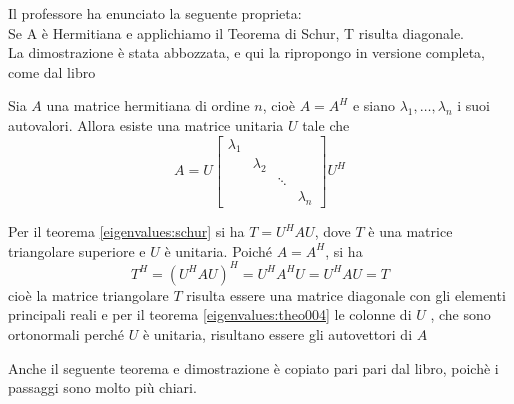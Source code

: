 \begin{notes}
 Il professore ha enunciato la seguente proprieta:\\
Se A \`e Hermitiana e applichiamo il Teorema di Schur, T risulta
diagonale. \\
La dimostrazione \`e stata abbozzata, e qui la ripropongo
in versione completa, come dal libro
\end{notes}
% 
%    
% 
% 

\begin{theo} \label{eigenvalues:theo005}
 Sia $A$ una matrice hermitiana di ordine $n$, cio\`e
$A = A^{H}$ e siano $\lambda_1, \ldots, \lambda_n$ i suoi
autovalori. Allora esiste una matrice unitaria $U$
tale che
$$ A = U
\left[
\begin{array}{cccc}
\lambda_1 & & &  \\
& \lambda_2 & &  \\
 & & \ddots &  \\
 & &  & \lambda_n 
\end{array}
\right]
U^{H}
$$
\end{theo}


\begin{thproof}
Per il teorema \ref{eigenvalues:schur} si ha $T = U^{H}AU$, dove $T$ \`e 
una matrice triangolare superiore e $U$ \`e unitaria. Poich\'e $A =A^{H}$, si ha
$$ T^{H} = (U^{H}AU)^{H} = U^{H}A^{H}U = U^{H}AU = T$$
cio\`e la matrice triangolare $T$ risulta essere una matrice
diagonale con gli elementi principali reali e per il teorema
\ref{eigenvalues:theo004} le colonne di $U$ , che sono ortonormali perch\'e $U$
\`e unitaria, risultano essere gli autovettori di $A$
\end{thproof}

\begin{notes}
 Anche il seguente teorema e dimostrazione \`e copiato pari pari
dal libro, poich\`e i passaggi sono molto più chiari.
\end{notes}

